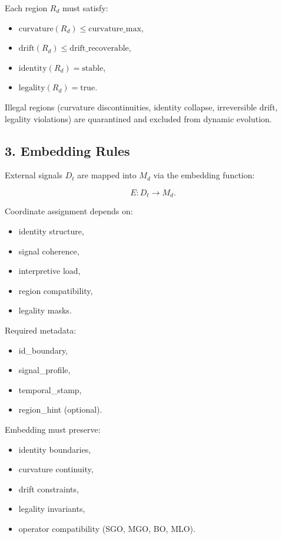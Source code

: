Each region $R_d$ must satisfy:
\begin{itemize}[leftmargin=1.2cm]
    \item $\text{curvature}(R_d) \leq \text{curvature\_max}$,
    \item $\text{drift}(R_d) \leq \text{drift\_recoverable}$,
    \item $\text{identity}(R_d) = \text{stable}$,
    \item $\text{legality}(R_d) = \text{true}$.
\end{itemize}

Illegal regions (curvature discontinuities, identity collapse, irreversible
drift, legality violations) are quarantined and excluded from dynamic evolution.

\subsection*{3. Embedding Rules}
\label{boot:fgd_embedding}

External signals $D_t$ are mapped into $M_d$ via the embedding function:



\[
E : D_t \rightarrow M_d.
\]



Coordinate assignment depends on:
\begin{itemize}[leftmargin=1.2cm]
    \item identity structure,
    \item signal coherence,
    \item interpretive load,
    \item region compatibility,
    \item legality masks.
\end{itemize}

Required metadata:
\begin{itemize}[leftmargin=1.2cm]
    \item id\_boundary,
    \item signal\_profile,
    \item temporal\_stamp,
    \item region\_hint (optional).
\end{itemize}

Embedding must preserve:
\begin{itemize}[leftmargin=1.2cm]
    \item identity boundaries,
    \item curvature continuity,
    \item drift constraints,
    \item legality invariants,
    \item operator compatibility (SGO, MGO, BO, MLO).
\end{itemize}


